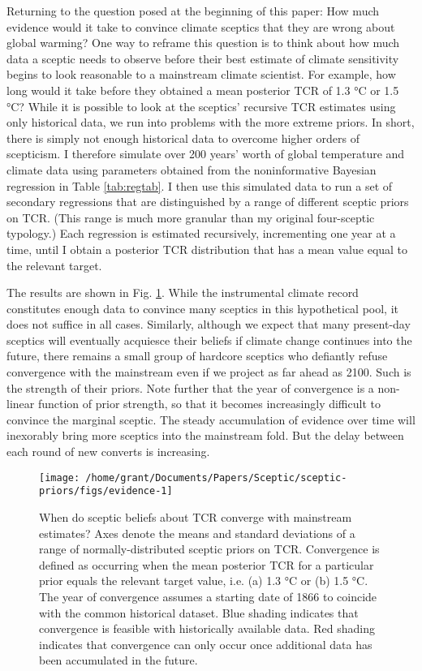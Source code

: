 \documentclass[smallextended]{svjour3}       %
\begin{document}
Returning to the question posed at the beginning of this paper: How much
evidence would it take to convince climate sceptics that they are wrong
about global warming? One way to reframe this question is to think about
how much data a sceptic needs to observe before their best estimate of
climate sensitivity begins to look reasonable to a mainstream climate
scientist. For example, how long would it take before they obtained a
mean posterior TCR of 1.3 °C or 1.5 °C? While it is possible to look at
the sceptics' recursive TCR estimates using only historical data, we run
into problems with the more extreme priors. In short, there is simply
not enough historical data to overcome higher orders of scepticism. I
therefore simulate over 200 years' worth of global temperature and
climate data using parameters obtained from the noninformative Bayesian
regression in Table \ref{tab:regtab}. I then use this simulated data to
run a set of secondary regressions that are distinguished by a range of
different sceptic priors on TCR. (This range is much more granular than
my original four-sceptic typology.) Each regression is estimated
recursively, incrementing one year at a time, until I obtain a posterior
TCR distribution that has a mean value equal to the relevant target.

The results are shown in Fig. \ref{fig:evidence}. While the instrumental
climate record constitutes enough data to convince many sceptics in this
hypothetical pool, it does not suffice in all cases. Similarly, although
we expect that many present-day sceptics will eventually acquiesce their
beliefs if climate change continues into the future, there remains a
small group of hardcore sceptics who defiantly refuse convergence with
the mainstream even if we project as far ahead as 2100. Such is the
strength of their priors. Note further that the year of convergence is a
non-linear function of prior strength, so that it becomes increasingly
difficult to convince the marginal sceptic. The steady accumulation of
evidence over time will inexorably bring more sceptics into the
mainstream fold. But the delay between each round of new converts is
increasing.

\begin{figure}

{\centering \texttt{[image: /home/grant/Documents/Papers/Sceptic/sceptic-priors/figs/evidence-1]} 

}

\caption{When do sceptic beliefs about TCR converge with mainstream estimates? Axes denote the means and standard deviations of a range of normally-distributed sceptic priors on TCR. Convergence is defined as occurring when the mean posterior TCR for a particular prior equals the relevant target value, i.e. (a) 1.3 °C or (b) 1.5 °C. The year of convergence assumes a starting date of 1866 to coincide with the common historical dataset. Blue shading indicates that convergence is feasible with historically available data. Red shading indicates that convergence can only occur once additional data has been accumulated in the future.}\label{fig:evidence}
\end{figure}
\end{document}
